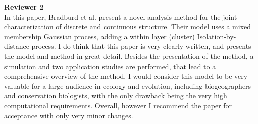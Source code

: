 \documentclass[11pt]{letter}
\begin{document}
\textbf{Reviewer 2}\\
In this paper, Bradburd et al. present a novel analysis method for the joint characterization of discrete and continuous structure. Their model uses a mixed membership Gaussian process, adding a within layer (cluster) Isolation-by-distance-process. I do think that this paper is very clearly written, and presents the model and method in great detail. Besides the presentation of the method, a simulation and two application studies are performed, that lead to a comprehensive overview of the method. I would consider this model to be very valuable for a large audience in ecology and evolution, including biogeographers and conservation biologists, with the only drawback being the very high computational requirements. Overall, however I recommend the paper for acceptance with only very minor changes.
\end{document}

